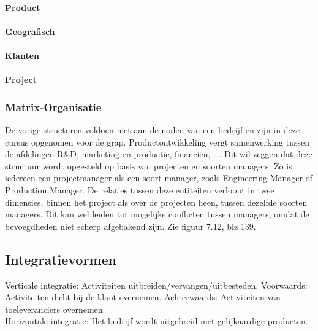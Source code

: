 \documentclass[12pt]{article}
\begin{document}
\paragraph{Product}
\paragraph{Geografisch}
\paragraph{Klanten}
\paragraph{Project}
\subsubsection{Matrix-Organisatie}
De vorige structuren voldoen niet aan de noden van een bedrijf en zijn in deze cursus opgenomen voor de grap. Productontwikkeling vergt samenwerking tussen de afdelingen R\&D, marketing en productie, financi\"en, \dots. Dit wil zeggen dat deze structuur wordt opgesteld op basis van projecten en soorten managers. Zo is iedereen een projectmanager als een soort manager, zoals Engineering Manager of Production Manager. De relaties tussen deze entiteiten verloopt in twee dimensies, binnen het project als over de projecten heen, tussen dezelfde soorten managers. Dit kan wel leiden tot mogelijke conflicten tussen managers, omdat de bevoegdheden niet scherp afgebakend zijn. Zie figuur 7.12, blz 139.
\subsection{Integratievormen}
Verticale integratie: Activiteiten uitbreiden/vervangen/uitbesteden. Voorwaards: Activiteiten dicht bij de klant overnemen. Achterwaards: Activiteiten van toeleveranciers overnemen.\\
Horizontale integratie: Het bedrijf wordt uitgebreid met gelijkaardige producten.
\end{document}
